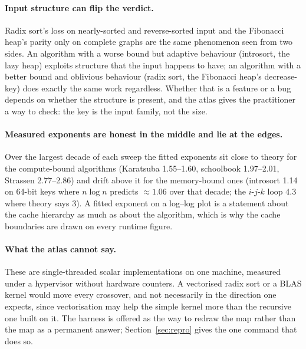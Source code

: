 \paragraph{Input structure can flip the verdict.}
Radix sort's loss on nearly-sorted and reverse-sorted input and the Fibonacci
heap's parity only on complete graphs are the same phenomenon seen from two
sides. An algorithm
with a worse bound but adaptive behaviour (introsort, the lazy heap) exploits
structure that the input happens to have; an algorithm with a better bound
and oblivious behaviour (radix sort, the Fibonacci heap's decrease-key) does
exactly the same work regardless. Whether that is a feature or a bug depends
on whether the structure is present, and the atlas gives the practitioner a
way to check: the key is the input family, not the size.

\paragraph{Measured exponents are honest in the middle and lie at the edges.}
Over the largest decade of each sweep the fitted exponents sit close to theory
for the compute-bound algorithms (Karatsuba 1.55--1.60, schoolbook
1.97--2.01, Strassen 2.77--2.86) and drift above it for the memory-bound ones (introsort 1.14 on 64-bit keys where $n\log n$ predicts $\approx1.06$
over that decade; the $i$-$j$-$k$ loop 4.3 where theory says 3). A fitted exponent on a log--log plot is a statement about the cache
hierarchy as much as about the algorithm, which is why the cache boundaries
are drawn on every runtime figure.

\paragraph{What the atlas cannot say.}
These are single-threaded scalar implementations on one machine, measured
under a hypervisor without hardware counters. A vectorised radix sort or a
BLAS kernel would move every crossover, and not necessarily in the direction one
expects, since vectorisation may help the simple kernel more than the
recursive one built on it. The harness is
offered as the way to redraw the map rather than the map as a permanent
answer; Section~\ref{sec:repro} gives the one command that does so.

